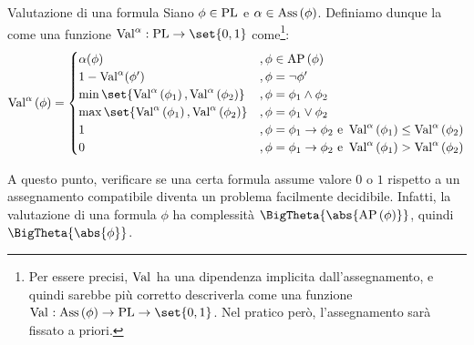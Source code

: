 \begin{definition}{Valutazione di una formula}
  Siano \(\phi \in \operatorname{PL}\) e \(\alpha \in \operatorname{Ass}\left(\phi\right)\). Definiamo dunque la  come una funzione \(\Val{\alpha}: \PL \to \set{0,1}\) come\footnote{Per essere precisi, \(\Val{}\) ha una dipendenza implicita dall'assegnamento, e quindi sarebbe più corretto descriverla come una funzione \(\Val{}: \Ass{\phi} \to \PL \to \set{0,1}\). Nel pratico però, l'assegnamento sarà fissato a priori.}:
  \[\Val{\alpha}[\phi] = \begin{cases}
  \alpha(\phi) &, \phi \in \AP[\phi] \\
  1 - \Val{\alpha}(\phi') &, \phi = \neg \phi' \\
  \min\set{\Val{\alpha}[\phi_1], \Val{\alpha}[\phi_2]} &, \phi = \phi_1 \land \phi_2 \\
  \max\set{\Val{\alpha}[\phi_1], \Val{\alpha}[\phi_2]} &, \phi = \phi_1 \lor \phi_2 \\
  1 &, \phi = \phi_1 \rightarrow \phi_2 \text{ e } \Val{\alpha}[\phi_1] \leq \Val{\alpha}[\phi_2] \\
  0 &, \phi = \phi_1 \rightarrow \phi_2 \text{ e } \Val{\alpha}[\phi_1] > \Val{\alpha}[\phi_2]
  \end{cases}\]
\end{definition}

A questo punto, verificare se una certa formula assume valore \(0\) o \(1\) rispetto a un assegnamento compatibile diventa un problema facilmente decidibile. 
Infatti, la valutazione di una formula \(\phi\) ha complessità \(\BigTheta{\abs{\AP[\phi]}}\), quindi \(\BigTheta{\abs{\phi}}\).

